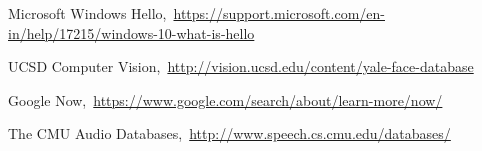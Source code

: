 \cleardoublepage
{}
{}
\begin{thebibliography}{99}

Microsoft Windows Hello,\ \url{https://support.microsoft.com/en-in/help/17215/windows-10-what-is-hello}

UCSD Computer Vision,\ \url{http://vision.ucsd.edu/content/yale-face-database}

Google Now,\ \url{https://www.google.com/search/about/learn-more/now/}

The CMU Audio Databases,\ \url{http://www.speech.cs.cmu.edu/databases/}

\end{thebibliography}
